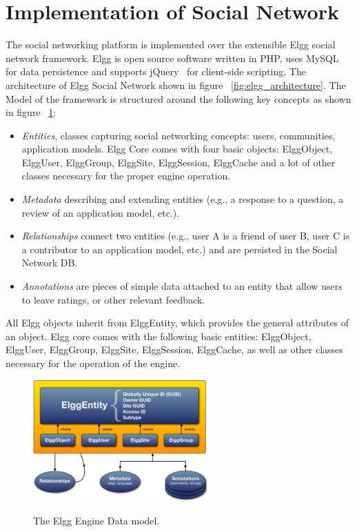 \section{Implementation of Social Network}
\label{sec:implementaion_of_social_netowrk}
The social networking platform is implemented over the extensible Elgg social network framework\cite{elgg_url}.  Elgg is open source software written in PHP, uses MySQL for data persistence and supports jQuery~\cite{jquery_url} for client-side scripting.  The architecture of Elgg Social Network shown in figure ~\ref{fig:elgg_architecture}. The Model of the framework is structured around the following key concepts as shown in figure ~\ref{fig:elgg_entities}:
\begin{itemize}
\item \emph{Entities}, classes capturing social networking concepts: users, communities, application models. Elgg Core comes with four basic objects: ElggObject, ElggUser, ElggGroup, ElggSite, ElggSession, ElggCache and a lot of other classes necessary for the proper engine operation.
\item \emph{Metadata} describing and extending entities (e.g., a response to a question, a review of an application model, etc.).
\item  \emph{Relationships} connect two entities (e.g., user A is a friend of user B, user C is a contributor to an application model, etc.) and are persisted in the Social Network DB.
\item \emph{Annotations} are pieces of simple data attached to an entity that allow users to leave ratings, or other relevant feedback.
\end{itemize}
All Elgg objects inherit from ElggEntity, which provides the general attributes of an object. Elgg core comes with the following basic entities: ElggObject, ElggUser, ElggGroup, ElggSite, ElggSession, ElggCache, as well as other classes necessary for the operation of the engine.

\begin{figure}[h]
	\caption{The Elgg Engine Data model.}
	\includegraphics[width=0.6\textwidth,natwidth=200,natheight=150]{./fig/elgg_data_model.png}
	\centering
	\label{fig:elgg_entities}
\end{figure}

